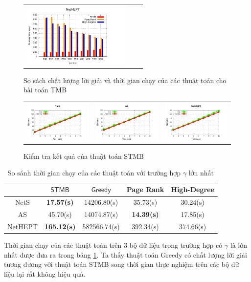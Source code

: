 \begin{figure}
\begin{tabular}{lll}
	\includegraphics[height = 3.2cm]{picture/TimeNetHEPT}
\end{tabular}
\caption{So sách chất lượng lời giải và thời gian chạy của các thuật toán cho bài toán TMB}
\label{solSTMB}    
\end{figure}
\begin{figure}[hbt]
\begin{tabular}{ccc}
	\includegraphics[height = 3.2 cm]{picture/CheckNetS} &
	\includegraphics[height = 3.2 cm]{picture/CheckAS} &   
	\includegraphics[height = 3.2 cm]{picture/CheckNetHEPT}
\end{tabular}
\caption{Kiểm tra kết quả của thuật toán STMB}
\label{check}    
\end{figure}
\begin{table}[h]
\label{tab:time}       %
\begin{center}
	\begin{tabular}{|c|c|c|c|c|}				
		\hline 
		\textbf{} & {$\mathsf{STMB}$} & {$\mathsf{Greedy}$} & {Page Rank} & {High-Degree} 				
		\\ 
		\hline 
		NetS & \textbf{17.57(s)} &	14206.80(s) &	35.73(s) &	30.24(s)
		\\ 
		\hline 
		AS & 45.70(s) & 14074.87(s) & \textbf{14.39(s)} &	17.85(s)
		\\
		\hline 
		NetHEPT & \textbf{165.12(s)} & 582566.74(s) & 392.34(s) & 374.66(s)
		\\
		\hline 
	\end{tabular}
\end{center}
\caption{So sánh thời gian chạy của các thuật toán với trường hợp $\gamma$ lớn nhất}
\label{timeSTMB}
\end{table}
Thời gian chạy của các thuật toán trên 3 bộ dữ liệu trong trường hợp có $\gamma$ là lớn nhất được đưa ra trong bảng \ref{timeSTMB}. Ta thấy thuật toán Greedy có chất lượng lời giải tương đương với thuật toán STMB song thời gian thực nghiệm trên các bộ dữ liệu lại rất không hiệu quả.
